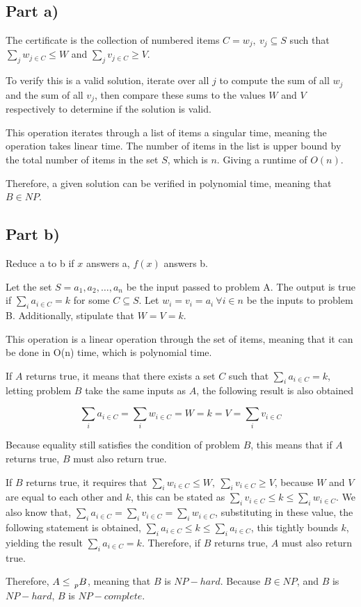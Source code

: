 \section{}
\subsection*{Part a)}
The certificate is the collection of numbered items $C={w_j,\ v_j}\subseteq S$ such that $\sum_{j} w_{j\in C}\le W$ and $\sum_{j} v_{j\in C}\geq V$.

To verify this is a valid solution, iterate over all $j$ to compute the sum of all $w_j$ and the sum of all $v_j$, then compare these sums to the values $W$ and $V$ respectively to determine if the solution is valid.

This operation iterates through a list of items a singular time, meaning the operation takes linear time. The number of items in the list is upper bound by the total number of items in the set $S$, which is $n$. Giving a runtime of $O(n)$.

Therefore, a given solution can be verified in polynomial time, meaning that $B \in NP$.

\subsection*{Part b)}

Reduce a to b if $x$ answers a, $f(x)$ answers b.

Let the set $S={a_1,a_2,\ldots,a_n}$ be the input passed to problem A. The output is true if $\sum_{i} a_{i\in C}=k$ for some $C\subseteq S$. Let $w_i=v_i=a_i\ \forall i\in n$ be the inputs to problem B. Additionally, stipulate that $W=V=k$.

This operation is a linear operation through the set of items, meaning that it can be done in O(n) time, which is polynomial time.

If $A$ returns true, it means that there exists a set $C$ such that $\sum_{i} a_{i\in C}=k$, letting problem $B$ take the same inputs as $A$, the following result is also obtained 

\[\sum_{i} a_{i\in C}=\sum_{i}{w_{i\in C}=W=k=V=\sum_{i} v_{i\in C}}\]

Because equality still satisfies the condition of problem $B$, this means that if $A$ returns true, $B$ must also return true.

If $B$ returns true, it requires that $\sum_{i}{w_{i\in C}\le W,\ \sum_{i} v_{i\in C}}\geq V$, because $W$ and $V$ are equal to each other and $k$, this can be stated as $\sum_{i} v_{i\in C}\le k\le\sum_{i} w_{i\in C}$. We also know that, $\sum_{i} a_{i\in C}=\sum_{i} v_{i\in C}=\sum_{i} w_{i\in C}$, substituting in these value, the following statement is obtained, $\sum_{i} a_{i\in C}\le k\le\sum_{i} a_{i\in C}$, this tightly bounds $k$, yielding the result $\sum_{i} a_{i\in C}=k$. Therefore, if $B$ returns true, $A$ must also return true.

Therefore, $A \leq{} \prescript{}{p}{B}$, meaning that $B$ is $NP-hard$. Because $B \in NP$, and $B$ is $NP-hard$, $B$ is $NP-complete$.
